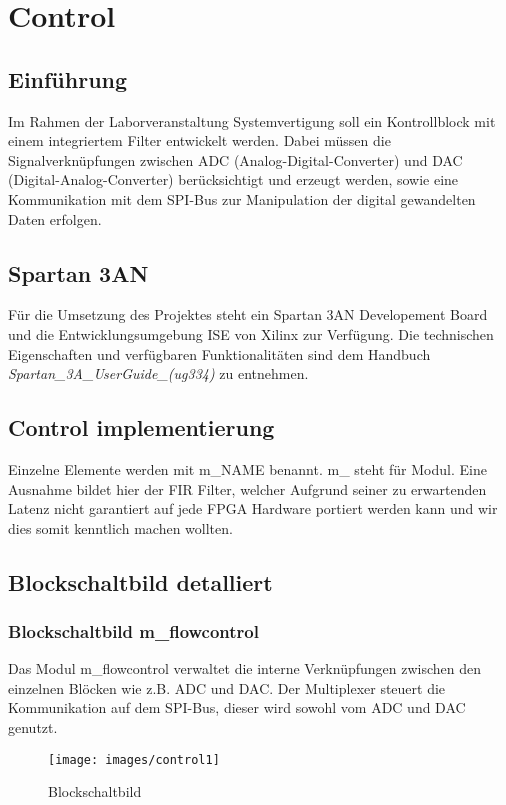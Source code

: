 \chapter{Control}
\section{Einführung}
Im Rahmen der Laborveranstaltung Systemvertigung soll ein Kontrollblock mit einem integriertem Filter entwickelt werden. Dabei müssen die Signalverknüpfungen zwischen ADC (Analog-Digital-Converter) und DAC (Digital-Analog-Converter) berücksichtigt und erzeugt werden, sowie eine Kommunikation mit dem SPI-Bus zur Manipulation der digital gewandelten Daten erfolgen.

\section{Spartan 3AN}
Für die Umsetzung des Projektes steht ein Spartan 3AN Developement Board und die Entwicklungsumgebung ISE von Xilinx zur Verfügung.
Die technischen Eigenschaften und verfügbaren Funktionalitäten sind dem Handbuch \textit{Spartan\_3A\_UserGuide\_(ug334)} zu entnehmen.

\section{Control implementierung}
Einzelne Elemente werden mit m\_NAME benannt. m\_ steht für Modul. Eine Ausnahme bildet hier der FIR Filter, welcher Aufgrund seiner zu erwartenden Latenz nicht garantiert auf jede FPGA Hardware portiert werden kann und wir dies somit kenntlich machen wollten.  



\section{Blockschaltbild detalliert}

\subsection{Blockschaltbild m\_flowcontrol}
Das Modul m\_flowcontrol verwaltet die interne Verknüpfungen zwischen den einzelnen Blöcken wie z.B. ADC und DAC.
Der Multiplexer steuert die Kommunikation auf dem SPI-Bus, dieser wird sowohl vom ADC und DAC genutzt.

\begin{figure}[H]
	\centering
	\texttt{[image: images/control1]}
	\caption{Blockschaltbild}
	\label{fig:control1}
\end{figure}


